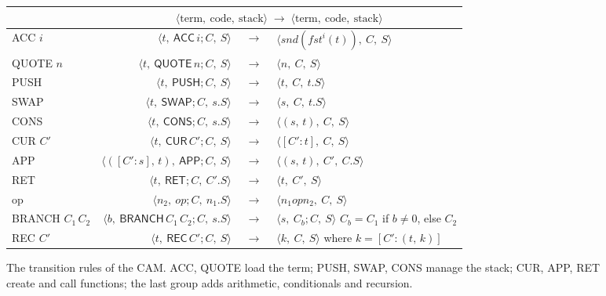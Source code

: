 \documentclass[11pt,a4paper]{article}
\newcommand{\ins}[1]{\textsf{#1}}
\newcommand{\clo}[2]{[#1 : #2]}
\newcommand{\pr}[2]{(#1,\, #2)}
\newcommand{\trans}{\;\longrightarrow\;}
\newcommand{\cs}[3]{\langle #1,\ #2,\ #3\rangle}
\newcommand{\seq}{\mathbin{;}}
\theoremstyle{definition}
\theoremstyle{plain}
\begin{document}
\begin{figure}[t]
\centering
\small
\renewcommand{\arraystretch}{1.25}
\begin{tabular}{@{}l r@{\;}c@{\;}l@{}}
\toprule
& \multicolumn{3}{c}{$\cs{\text{term}}{\text{code}}{\text{stack}} \trans \cs{\text{term}}{\text{code}}{\text{stack}}$}\\
\midrule
\ins{ACC} $i$ & $\cs{t}{\ins{ACC}\,i\seq C}{S}$ &$\trans$& $\cs{\mathit{snd}(\mathit{fst}^i(t))}{C}{S}$\\
\ins{QUOTE} $n$ & $\cs{t}{\ins{QUOTE}\,n\seq C}{S}$ &$\trans$& $\cs{n}{C}{S}$\\
\midrule
\ins{PUSH} & $\cs{t}{\ins{PUSH}\seq C}{S}$ &$\trans$& $\cs{t}{C}{t.S}$\\
\ins{SWAP} & $\cs{t}{\ins{SWAP}\seq C}{s.S}$ &$\trans$& $\cs{s}{C}{t.S}$\\
\ins{CONS} & $\cs{t}{\ins{CONS}\seq C}{s.S}$ &$\trans$& $\cs{\pr{s}{t}}{C}{S}$\\
\midrule
\ins{CUR} $C'$ & $\cs{t}{\ins{CUR}\,C'\seq C}{S}$ &$\trans$& $\cs{\clo{C'}{t}}{C}{S}$\\
\ins{APP} & $\cs{\pr{\clo{C'}{s}}{t}}{\ins{APP}\seq C}{S}$ &$\trans$& $\cs{\pr{s}{t}}{C'}{C.S}$\\
\ins{RET} & $\cs{t}{\ins{RET}\seq C}{C'.S}$ &$\trans$& $\cs{t}{C'}{S}$\\
\midrule
\ins{op} & $\cs{n_2}{\textit{op}\seq C}{n_1.S}$ &$\trans$& $\cs{n_1 \mathbin{\textit{op}} n_2}{C}{S}$\\
\ins{BRANCH} $C_1\,C_2$ & $\cs{b}{\ins{BRANCH}\,C_1\,C_2\seq C}{s.S}$ &$\trans$& $\cs{s}{C_b\seq C}{S}$
  \quad $C_b = C_1$ if $b\neq 0$, else $C_2$\\
\ins{REC} $C'$ & $\cs{t}{\ins{REC}\,C'\seq C}{S}$ &$\trans$& $\cs{k}{C}{S}$ \quad where $k = \clo{C'}{\pr{t}{k}}$\\
\bottomrule
\end{tabular}
\caption{The transition rules of the CAM. \ins{ACC}, \ins{QUOTE} load the
term; \ins{PUSH}, \ins{SWAP}, \ins{CONS} manage the stack; \ins{CUR},
\ins{APP}, \ins{RET} create and call functions; the last group adds
arithmetic, conditionals and recursion.}
\label{fig:rules}
\end{figure}
\end{document}
